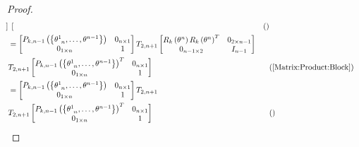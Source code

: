 \documentclass[stu, babel, american, biblatex, a4paper, leqno, draftall]{apa7}
\begin{document}
\begin{proof}
\begin{align*}
\begin{bmatrix}
        \end{bmatrix} && \text{()} \\
        &=
        \begin{bmatrix}
            P_{k,n-1}\left(\left\{\tensor{\theta}{^1_{n}},\dots,\tensor{\theta}{^{n-1}}\right\}\right) & 0_{n\times 1} \\
            0_{1\times n}                                                                              & 1             \\
        \end{bmatrix}
        T_{2,n+1}
        \begin{bmatrix}
            R_k\left(\tensor{\theta}{^n}\right)R_k\left(\tensor{\theta}{^n}\right)^T & 0_{{2}\times{n-1}} \\
            0_{{n-1}\times{2}}                  & {I}_{n-1}          \\
        \end{bmatrix}\\
        &
        T_{2,n+1}
        \begin{bmatrix}
            P_{k,n-1}\left(\left\{\tensor{\theta}{^1_{n}},\dots,\tensor{\theta}{^{n-1}}\right\}\right)^T & 0_{n\times 1} \\
            0_{1\times n}                                                                              & 1             \\
        \end{bmatrix} && \text{(\cref{Matrix:Product:Block})} \\
        &=
        \begin{bmatrix}
            P_{k,n-1}\left(\left\{\tensor{\theta}{^1_{n}},\dots,\tensor{\theta}{^{n-1}}\right\}\right) & 0_{n\times 1} \\
            0_{1\times n}                                                                              & 1             \\
        \end{bmatrix}
        T_{2,n+1}\\
        &
        T_{2,n+1}
        \begin{bmatrix}
            P_{k,n-1}\left(\left\{\tensor{\theta}{^1_{n}},\dots,\tensor{\theta}{^{n-1}}\right\}\right)^T & 0_{n\times 1} \\
            0_{1\times n}                                                                              & 1             \\
        \end{bmatrix} && \text{()} \\

\end{align*}
\end{proof}
\end{document}
